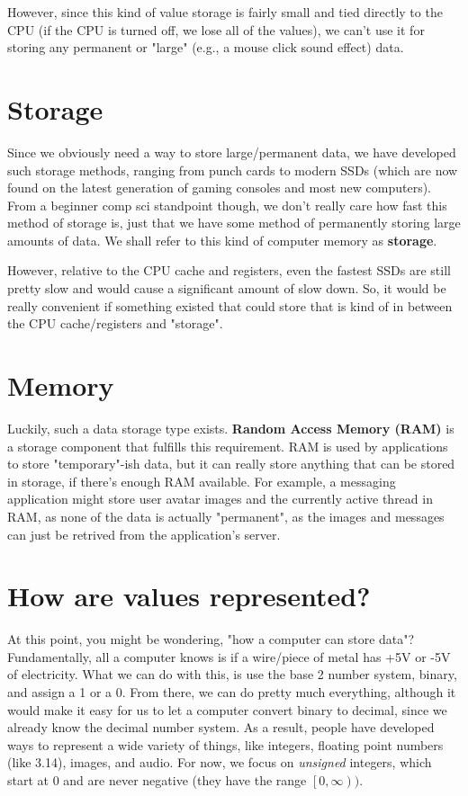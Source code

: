 \documentclass[11pt]{article}
\begin{document}
However, since this kind of value storage is fairly small and tied directly to the CPU (if the CPU is turned off, we lose all of the values), we can't use it for storing any permanent or "large" (e.g., a mouse click sound effect) data.

\section{Storage}
Since we obviously need a way to store large/permanent data, we have developed such storage methods, ranging from punch cards to modern SSDs (which are now found on the latest generation of gaming consoles and most new computers).
From a beginner comp sci standpoint though, we don't really care how fast this method of storage is, just that we have some method of permanently storing large amounts of data.
We shall refer to this kind of computer memory as \textbf{storage}.

However, relative to the CPU cache and registers, even the fastest SSDs are still pretty slow and would cause a significant amount of slow down.
So, it would be really convenient if something existed that could store that is kind of in between the CPU cache/registers and "storage".

\section{Memory}
Luckily, such a data storage type exists. \textbf{Random Access Memory (RAM)} is a storage component that fulfills this requirement. 
RAM is used by applications to store "temporary"-ish data, but it can really store anything that can be stored in storage, if there's enough RAM available.
For example, a messaging application might store user avatar images and the currently active thread in RAM, as none of the data is actually "permanent", as the images and messages can just be retrived from the application's server.

\section{How are values represented?}
At this point, you might be wondering, "how a computer can store data"? Fundamentally, all a computer knows is if a wire/piece of metal has +5V or -5V of electricity.
What we can do with this, is use the base 2 number system, binary, and assign a 1 or a 0. 
From there, we can do pretty much everything, although it would make it easy for us to let a computer convert binary to decimal, since we already know the decimal number system.
As a result, people have developed ways to represent a wide variety of things, like integers, floating point numbers (like 3.14), images, and audio.
For now, we focus on \textit{unsigned} integers, which start at 0 and are never negative (they have the range $\left[0, \infty\right)) $.
\end{document}
